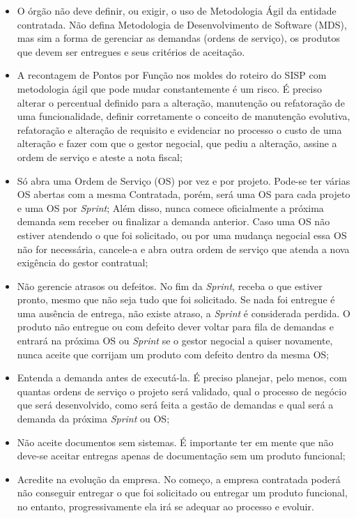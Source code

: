 \begin{itemize}
\item O órgão não deve definir, ou exigir, o uso de Metodologia Ágil da entidade contratada. Não defina Metodologia de Desenvolvimento de Software (MDS), mas sim a
forma de gerenciar as demandas (ordens de serviço), os produtos que devem ser entregues e seus critérios de aceitação. 
\item A recontagem de Pontos por Função nos moldes do roteiro do SISP com metodologia ágil que pode mudar constantemente é um risco. É preciso alterar o percentual definido para a alteração, manutenção ou refatoração de uma funcionalidade, definir corretamente o conceito de manutenção evolutiva, refatoração e alteração de requisito e evidenciar no processo o custo de uma alteração e fazer com que o gestor negocial, que pediu a alteração, assine a ordem de serviço e ateste a nota fiscal;
\item Só abra uma Ordem de Serviço (OS) por vez e por projeto. Pode-se ter várias OS abertas com a mesma Contratada, porém, será uma OS para cada projeto e uma OS por \textit{Sprint}; Além disso, nunca comece oficialmente a próxima demanda sem receber ou finalizar a demanda anterior. Caso uma OS não estiver atendendo o que foi solicitado, ou por uma mudança negocial essa OS não for necessária, cancele-a e abra outra ordem de serviço que atenda a nova exigência do gestor contratual;
\item Não gerencie atrasos ou defeitos. No fim da \textit{Sprint}, receba o que estiver pronto, mesmo que não seja tudo que foi solicitado. Se nada foi entregue é uma ausência de entrega, não existe atraso, a \textit{Sprint} é considerada perdida. O produto não entregue ou com defeito dever voltar para fila de demandas e entrará na próxima OS ou \textit{Sprint} se o gestor negocial a quiser novamente, nunca aceite que corrijam um produto com defeito dentro da mesma OS;
\item Entenda a demanda antes de executá-la. É preciso planejar, pelo menos, com quantas ordens de serviço o projeto será validado, qual o processo de negócio que será desenvolvido, como será feita a gestão de demandas e qual será a demanda da próxima \textit{Sprint} ou OS;
\item Não aceite documentos sem sistemas. É importante ter em mente que não deve-se aceitar entregas apenas de documentação sem um produto funcional;
\item Acredite na evolução da empresa. No começo, a empresa contratada poderá não conseguir entregar o que foi solicitado ou entregar um produto funcional, no entanto, progressivamente ela irá se adequar ao processo e evoluir. 
\end{itemize} 

